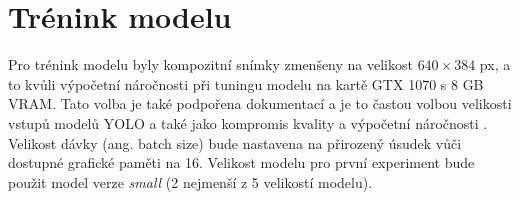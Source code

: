 \section{Trénink modelu}
\label{sec:Chapter42}
Pro trénink modelu byly kompozitní snímky zmenšeny na velikost $640\times384$ px, a to kvůli výpočetní náročnosti při tuningu modelu na kartě GTX 1070 s 8 GB VRAM. Tato volba je také podpořena dokumentací a je to častou volbou velikosti vstupů modelů YOLO a také jako kompromis kvality a výpočetní náročnosti \cite{ultralytics_cfg_doc}. Velikost dávky (ang. batch size) bude nastavena na přirozený úsudek vůči dostupné grafické paměti na 16. Velikost modelu pro první experiment bude použit model verze \textit{small} (2 nejmenší z 5 velikostí modelu).